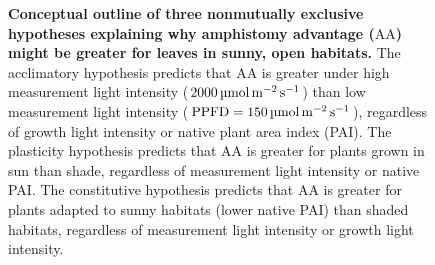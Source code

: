 \documentclass[
  letterpaper,
  DIV=11,
  numbers=noendperiod]{scrartcl}
\newcommand{\aax}{$\mathrm{AA}$}
\newcommand{\ppfdequals}[1]{$\mathrm{PPFD} = \qty{#1}{\micro\mol\raiseto{-2}\meter\raiseto{-1}\second}$}
\newcommand{\ppfdqty}[1]{$\qty{#1}{\micro\mol\raiseto{-2}\meter\raiseto{-1}\second}$}
\begin{document}
\begin{figure}


\caption{\label{fig-concept}\textbf{Conceptual outline of three nonmutually exclusive hypotheses explaining why amphistomy advantage (\aax{}) might be greater for leaves in sunny, open habitats.}
The acclimatory hypothesis predicts that \aax{} is greater under high
measurement light intensity (\ppfdqty{2000}) than low measurement light
intensity (\ppfdequals{150}), regardless of growth light intensity or
native plant area index (PAI). The plasticity hypothesis predicts that
\aax{} is greater for plants grown in sun than shade, regardless of
measurement light intensity or native PAI. The constitutive hypothesis
predicts that \aax{} is greater for plants adapted to sunny habitats
(lower native PAI) than shaded habitats, regardless of measurement light
intensity or growth light intensity.}

\end{figure}%
\end{document}

